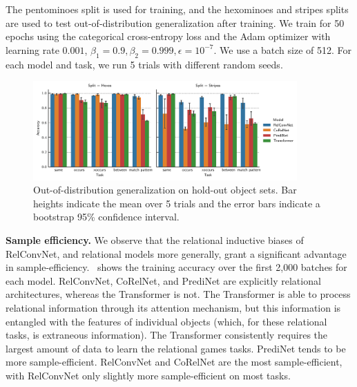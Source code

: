 The pentominoes split is used for training,
and the hexominoes and stripes splits are used to test out-of-distribution generalization after training. We train for 50 epochs using the categorical cross-entropy loss and the Adam optimizer with learning rate $0.001$, $\beta_1 = 0.9, \beta_2 = 0.999, \epsilon = 10^{-7}$. We use a batch size of 512. For each model and task, we run 5 trials with different random seeds.

\begin{figure}
    \centering
    \includegraphics[width=0.9\textwidth]{figs/experiments/relgames_ood_acc.pdf}
    \vskip-12pt
    \caption{Out-of-distribution generalization on hold-out object sets. Bar heights indicate the mean over 5 trials and the error bars indicate a bootstrap 95\% confidence interval.}\label{fig:ood_generalization}
    \vskip-15pt
\end{figure}

\textbf{Sample efficiency.} We observe that the relational inductive biases of RelConvNet, and relational models more generally, grant a significant advantage in sample-efficiency.~ shows the training accuracy over the first 2,000 batches for each model. RelConvNet, CoRelNet, and PrediNet are explicitly relational architectures, whereas the Transformer is not. The Transformer is able to process relational information through its attention mechanism, but this information is entangled with the features of individual objects (which, for these relational tasks, is extraneous information). The Transformer consistently requires the largest amount of data to learn the relational games tasks. PrediNet tends to be more sample-efficient. RelConvNet and CoRelNet are the most sample-efficient, with RelConvNet only slightly more sample-efficient on most tasks.

